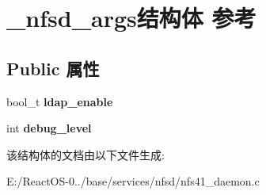 \hypertarget{struct__nfsd__args}{}\section{\+\_\+nfsd\+\_\+args结构体 参考}
\label{struct__nfsd__args}
\subsection*{Public 属性}
\begin{DoxyCompactItemize}
\item 
\mbox{\label{struct__nfsd__args_a868adc001eb0f5159f9f982c0ee4501e}} 
bool\+\_\+t {\bfseries ldap\+\_\+enable}
\item 
\mbox{\label{struct__nfsd__args_ad6a8805017bae4bca3504c1b48c36d67}} 
int {\bfseries debug\+\_\+level}
\end{DoxyCompactItemize}


该结构体的文档由以下文件生成\+:\begin{DoxyCompactItemize}
\item 
E\+:/\+React\+O\+S-\/0../base/services/nfsd/nfs41\+\_\+daemon.\+c\end{DoxyCompactItemize}
